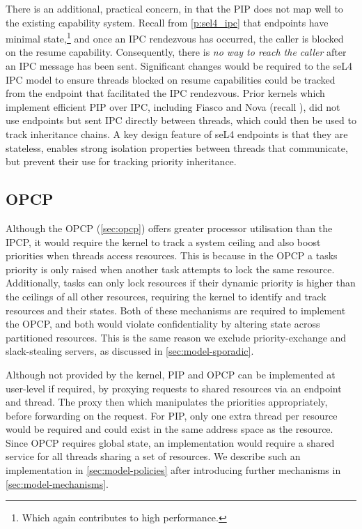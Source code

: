 There is an additional, practical concern, in that the \gls{PIP} does not map well to the existing
capability system. Recall from \cref{p:sel4_ipc} that endpoints have minimal state,\footnote{Which
again contributes to high performance.} and once an \gls{IPC} rendezvous has occurred, the caller is
blocked on the resume capability. Consequently, there is \emph{no way to reach the caller} after an 
\gls{IPC} message has been sent. 
Significant changes would be required to the seL4 \gls{IPC} model to ensure threads
blocked on resume capabilities could be tracked from the endpoint that facilitated the IPC
rendezvous. Prior kernels which implement efficient \gls{PIP} over \gls{IPC}, including Fiasco and Nova (recall
), did not use endpoints but sent \gls{IPC} directly between threads, which could
then be used to track inheritance chains. A key design feature of seL4 endpoints is that they are
stateless, enables strong isolation properties between threads that communicate, but prevent their
use for tracking priority inheritance. 

\subsection{\gls{OPCP}}

Although the \gls{OPCP} (\cref{sec:opcp}) offers greater processor utilisation than the \gls{IPCP}, it would require the
kernel to track a system ceiling and also boost priorities when threads access resources. This is
because in the \gls{OPCP} a tasks priority is only raised when another task attempts to lock the
same resource. Additionally, tasks can only lock resources if their dynamic priority is higher than
the ceilings of all other resources, requiring the kernel to identify and track resources and their
states. Both of these mechanisms are
required to implement the \gls{OPCP}, and both would violate confidentiality by altering state 
across partitioned resources.  This is the same reason we exclude
priority-exchange and slack-stealing servers, as discussed in \cref{sec:model-sporadic}.

Although not provided by the kernel, \gls{PIP} and \gls{OPCP} can be implemented at user-level if
required, by proxying requests to shared resources via an endpoint and thread. The proxy then which manipulates the priorities
appropriately, before forwarding on the request. For \gls{PIP}, only one extra thread per resource would 
be required and could exist in the same address space as the resource.
Since \gls{OPCP} requires global state, an implementation would require a shared service for all threads 
sharing a set of resources. We describe such an implementation in \cref{sec:model-policies} after introducing further mechanisms
in \cref{sec:model-mechanisms}.

